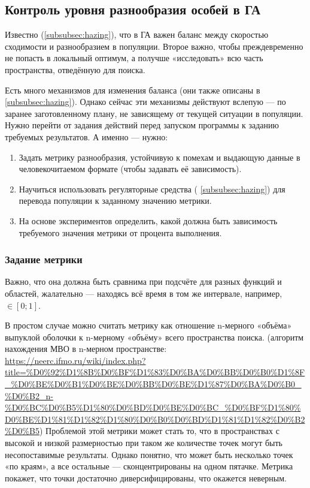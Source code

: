 \subsection{Контроль уровня разнообразия особей в ГА}\label{subsec:control_GA_diversity}
Известно (\ref{subsubsec:hazing}), что в ГА важен баланс между скоростью сходимости и разнообразием в популяции.
Второе важно, чтобы преждевременно не попасть в локальный оптимум, а получше «исследовать» всю часть пространства, отведённую для поиска.

Есть много механизмов для изменения баланса (они также описаны в \ref{subsubsec:hazing}).
Однако сейчас эти механизмы действуют вслепую — по заранее заготовленному плану, не зависящему от текущей ситуации в популяции.
Нужно перейти от задания действий перед запуском программы к заданию требуемых результатов.
А именно — нужно:
\begin{enumerate}
    \item Задать метрику разнообразия, устойчивую к помехам и выдающую данные в человекочитаемом формате (чтобы задавать её зависимость).
    \item Научиться использовать регуляторные средства ( \ref{subsubsec:hazing}) для перевода популяции к заданному значению метрики.
    \item На основе экспериментов определить, какой должна быть зависимость требуемого значения метрики от процента выполнения.
\end{enumerate}

\subsubsection{Задание метрики}
Важно, что она должна быть сравнима при подсчёте для разных функций и областей, жалательно — находясь всё время в том же интервале, например,
$\in [0; 1]$.

В простом случае можно считать метрику как отношение n-мерного «объёма» выпуклой оболочки к n-мерному «объёму» всего пространства поиска.
(алгоритм нахождения МВО в n-мерном пространстве: \url{https://neerc.ifmo.ru/wiki/index.php?title=%D0%92%D1%8B%D0%BF%D1%83%D0%BA%D0%BB%D0%B0%D1%8F_%D0%BE%D0%B1%D0%BE%D0%BB%D0%BE%D1%87%D0%BA%D0%B0_%D0%B2_n-%D0%BC%D0%B5%D1%80%D0%BD%D0%BE%D0%BC_%D0%BF%D1%80%D0%BE%D1%81%D1%82%D1%80%D0%B0%D0%BD%D1%81%D1%82%D0%B2%D0%B5})
Проблемой этой метрики может стать то, что в пространствах с высокой и низкой  размерностью при таком же количестве точек могут быть несопоставимые результаты.
Однако понятно, что может быть несколько точек «по краям», а все остальные — сконцентрированы на одном пятачке.
Метрика покажет, что точки достаточно диверсифицированы, что окажется неверным.

